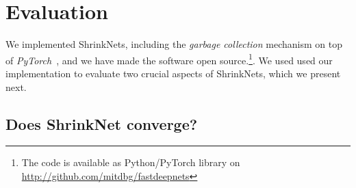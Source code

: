 \documentclass[sigconf]{acmart}
\newcommand{\gl}[1]{\textcolor{violet}{{\bf Gl:} #1}}
\begin{document}
\section{Evaluation}

We  implemented ShrinkNets, including the \emph{garbage collection}
mechanism on top of \textit{PyTorch}~\cite{paszke2017automatic}, and we have
made the software open source.\footnote{The code is available as Python/PyTorch
library on \url{http://github.com/mitdbg/fastdeepnets} 
}. We used used our implementation to evaluate two crucial aspects of
ShrinkNets, which we present next.


%


\subsection{Does ShrinkNet converge?}
\end{document}

